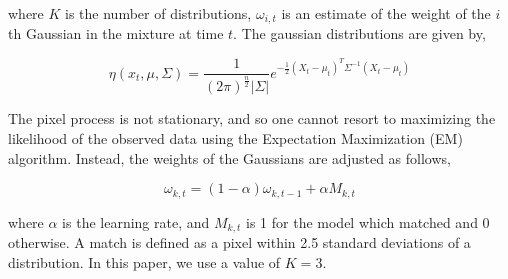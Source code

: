 \documentclass{article}
\begin{document}
where $K$ is the number of distributions,  $\omega_{i,t}$ is an estimate of the weight of the $i$th Gaussian in the mixture at time $t$.  The gaussian distributions are given by,

\begin{equation}
\eta(x_t, \mu, \Sigma)=\frac{1}{(2\pi)^\frac{n}{2}|\Sigma|}e^{-\frac{1}{2}(X_t-\mu_t)^T\Sigma^{-1}(X_t-\mu_t)}
\end{equation}

  The pixel process is not stationary, and so one cannot resort to maximizing the likelihood of the observed data using the Expectation Maximization (EM) algorithm.  Instead, the weights of the Gaussians are adjusted as follows,

\begin{equation}
\omega_{k,t} = (1-\alpha) \omega_{k,t-1} + \alpha M_{k,t}
\end{equation}

where $\alpha$ is the learning rate, and $M_{k,t}$ is 1 for the model which matched and 0 otherwise.  A match is defined as a pixel within 2.5 standard deviations of a distribution.  In this paper, we use a value of $K=3$. 

\end{document}
